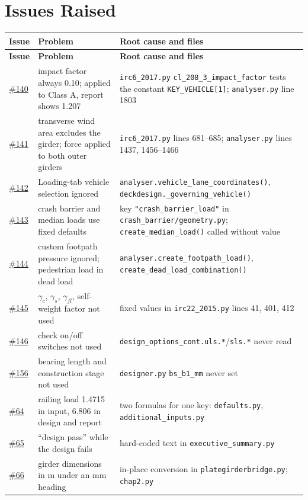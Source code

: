 \documentclass[10pt,a4paper]{article}
\newcommand{\gh}[1]{\href{https://github.com/Nidhikhare12/OsdagBridge/issues/#1}{\##1}}
\newcommand{\issPF}{\gh{145}}   %
\newcommand{\issCS}{\gh{146}}   %
\newcommand{\issBL}{\gh{156}}   %
\begin{document}
\section{Issues Raised}
\begin{longtable}{@{}L{1.1cm}L{7.0cm}L{7.5cm}@{}}
\toprule
\textbf{Issue} & \textbf{Problem} & \textbf{Root cause and files}\\
\midrule\endfirsthead
\toprule \textbf{Issue} & \textbf{Problem} & \textbf{Root cause and files}\\ \midrule\endhead
\gh{140} & impact factor always 0.10; applied to Class A, report shows 1.207 & \texttt{irc6\_2017.py} \texttt{cl\_208\_3\_impact\_factor} tests the constant \texttt{KEY\_VEHICLE[1]}; \texttt{analyser.py} line 1803\\
\gh{141} & transverse wind area excludes the girder; force applied to both outer girders & \texttt{irc6\_2017.py} lines 681--685; \texttt{analyser.py} lines 1437, 1456--1466\\
\gh{142} & Loading-tab vehicle selection ignored & \texttt{analyser.vehicle\_lane\_coordinates()}, \texttt{deckdesign.\_governing\_vehicle()}\\
\gh{143} & crash barrier and median loads use fixed defaults & key \texttt{"crash\_barrier\_load"} in \texttt{crash\_barrier/geometry.py}; \texttt{create\_median\_load()} called without value\\
\gh{144} & custom footpath pressure ignored; pedestrian load in dead load & \texttt{analyser.create\_footpath\_load()}, \texttt{create\_dead\_load\_combination()}\\
\issPF & $\gamma_c$, $\gamma_s$, $\gamma_{fl}$, self-weight factor not used & fixed values in \texttt{irc22\_2015.py} lines 41, 401, 412\\
\issCS & check on/off switches not used & \texttt{design\_options\_cont.uls.*}/\texttt{sls.*} never read\\
\issBL & bearing length and construction stage not used & \texttt{designer.py} \texttt{bs\_b1\_mm} never set\\
\gh{64} & railing load 1.4715 in input, 6.806 in design and report & two formulas for one key: \texttt{defaults.py}, \texttt{additional\_inputs.py}\\
\gh{65} & ``design pass'' while the design fails & hard-coded text in \texttt{executive\_summary.py}\\
\gh{66} & girder dimensions in m under an mm heading & in-place conversion in \texttt{plategirderbridge.py}; \texttt{chap2.py}\\

\end{longtable}
\end{document}
